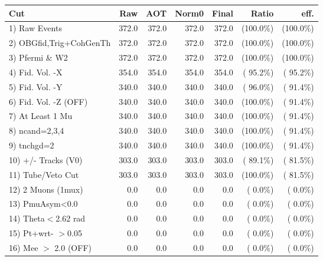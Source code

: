  \begin{table}[h!]\centering
 \begin{tabular}{||l||r|r|r|r|r|r||}
 \hline
 \hline
 Cut & Raw & AOT & Norm0 & Final & Ratio & eff.       \\
 \hline
  1) Raw Events           &        372.0 &        372.0 &        372.0 &        372.0 & (100.0\%) & (100.0\%) \\
  2) OBGfid,Trig+CohGenTh &        372.0 &        372.0 &        372.0 &        372.0 & (100.0\%) & (100.0\%) \\
  3) Pfermi \& W2         &        372.0 &        372.0 &        372.0 &        372.0 & (100.0\%) & (100.0\%) \\
  4) Fid. Vol. -X         &        354.0 &        354.0 &        354.0 &        354.0 & ( 95.2\%) & ( 95.2\%) \\
  5) Fid. Vol. -Y         &        340.0 &        340.0 &        340.0 &        340.0 & ( 96.0\%) & ( 91.4\%) \\
  6) Fid. Vol. -Z (OFF)   &        340.0 &        340.0 &        340.0 &        340.0 & (100.0\%) & ( 91.4\%) \\
  7) At Least 1 Mu        &        340.0 &        340.0 &        340.0 &        340.0 & (100.0\%) & ( 91.4\%) \\
  8) ncand=2,3,4          &        340.0 &        340.0 &        340.0 &        340.0 & (100.0\%) & ( 91.4\%) \\
  9) tnchgd=2             &        340.0 &        340.0 &        340.0 &        340.0 & (100.0\%) & ( 91.4\%) \\
 10) +/- Tracks (V0)      &        303.0 &        303.0 &        303.0 &        303.0 & ( 89.1\%) & ( 81.5\%) \\
 11) Tube/Veto Cut        &        303.0 &        303.0 &        303.0 &        303.0 & (100.0\%) & ( 81.5\%) \\
 12) 2 Muons (1mux)       &          0.0 &          0.0 &          0.0 &          0.0 & (  0.0\%) & (  0.0\%) \\
 13) PmuAsym<0.0          &          0.0 &          0.0 &          0.0 &          0.0 & (  0.0\%) & (  0.0\%) \\
 14) Theta$<$2.62 rad     &          0.0 &          0.0 &          0.0 &          0.0 & (  0.0\%) & (  0.0\%) \\
 15) Pt+wrt- $>$0.05      &          0.0 &          0.0 &          0.0 &          0.0 & (  0.0\%) & (  0.0\%) \\
 16) Mee $>$ 2.0  (OFF)   &          0.0 &          0.0 &          0.0 &          0.0 & (  0.0\%) & (  0.0\%) \\

\end{tabular}
\end{table}

